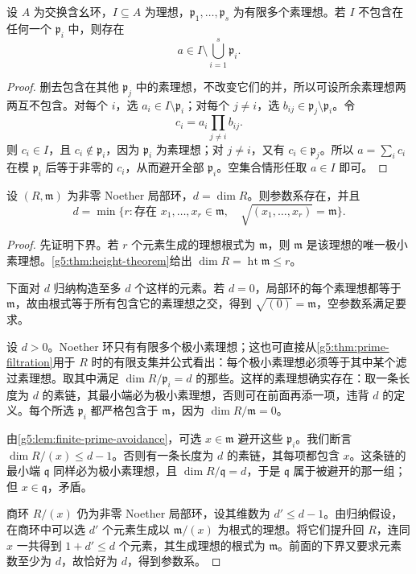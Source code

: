 \begin{lemma}[有限素理想避开引理]
\label{g5:lem:finite-prime-avoidance}
	设 \(A\) 为交换含幺环，\(I\subseteq A\) 为理想，\(\mathfrak p_1,\ldots,\mathfrak p_s\) 为有限多个素理想。若 \(I\) 不包含在任何一个 \(\mathfrak p_i\) 中，则存在
	\[
		a\in I\setminus\bigcup_{i=1}^s\mathfrak p_i.
	\]
\end{lemma}
\begin{proof}
	删去包含在其他 \(\mathfrak p_j\) 中的素理想，不改变它们的并，所以可设所余素理想两两互不包含。对每个 \(i\)，选 \(a_i\in I\setminus\mathfrak p_i\)；对每个 \(j\ne i\)，选 \(b_{ij}\in\mathfrak p_j\setminus\mathfrak p_i\)。令
	\[
		c_i=a_i\prod_{j\ne i}b_{ij}.
	\]
	则 \(c_i\in I\)，且 \(c_i\notin\mathfrak p_i\)，因为 \(\mathfrak p_i\) 为素理想；对 \(j\ne i\)，又有 \(c_i\in\mathfrak p_j\)。所以 \(a=\sum_i c_i\) 在模 \(\mathfrak p_i\) 后等于非零的 \(c_i\)，从而避开全部 \(\mathfrak p_i\)。空集合情形任取 \(a\in I\) 即可。
\end{proof}

\begin{theorem}
\label{g5:thm:system-of-parameters}
	设 \((R,\mathfrak m)\) 为非零 Noether 局部环，\(d=\dim R\)。则参数系存在，并且
	\[
		d=\min\{r:\text{存在 }x_1,\ldots,x_r\in\mathfrak m,\quad
		\sqrt{(x_1,\ldots,x_r)}=\mathfrak m\}.
	\]
\end{theorem}
\begin{proof}
	先证明下界。若 \(r\) 个元素生成的理想根式为 \(\mathfrak m\)，则 \(\mathfrak m\) 是该理想的唯一极小素理想。\cref{g5:thm:height-theorem}给出
	\(\dim R=\operatorname{ht}\mathfrak m\leq r\)。

	下面对 \(d\) 归纳构造至多 \(d\) 个这样的元素。若 \(d=0\)，局部环的每个素理想都等于 \(\mathfrak m\)，故由根式等于所有包含它的素理想之交，得到 \(\sqrt{(0)}=\mathfrak m\)，空参数系满足要求。

	设 \(d>0\)。Noether 环只有有限多个极小素理想；这也可直接从\cref{g5:thm:prime-filtration}用于 \(R\) 时的有限支集并公式看出：每个极小素理想必须等于其中某个滤过素理想。取其中满足
	\(\dim R/\mathfrak p_i=d\)
	的那些。这样的素理想确实存在：取一条长度为 \(d\) 的素链，其最小端必为极小素理想，否则可在前面再添一项，违背 \(d\) 的定义。每个所选 \(\mathfrak p_i\) 都严格包含于 \(\mathfrak m\)，因为 \(\dim R/\mathfrak m=0\)。

	由\cref{g5:lem:finite-prime-avoidance}，可选 \(x\in\mathfrak m\) 避开这些 \(\mathfrak p_i\)。我们断言 \(\dim R/(x)\leq d-1\)。否则有一条长度为 \(d\) 的素链，其每项都包含 \(x\)。这条链的最小端 \(\mathfrak q\) 同样必为极小素理想，且 \(\dim R/\mathfrak q=d\)，于是 \(\mathfrak q\) 属于被避开的那一组；但 \(x\in\mathfrak q\)，矛盾。

	商环 \(R/(x)\) 仍为非零 Noether 局部环，设其维数为 \(d'\leq d-1\)。由归纳假设，在商环中可以选 \(d'\) 个元素生成以 \(\mathfrak m/(x)\) 为根式的理想。将它们提升回 \(R\)，连同 \(x\) 一共得到 \(1+d'\leq d\) 个元素，其生成理想的根式为 \(\mathfrak m\)。前面的下界又要求元素数至少为 \(d\)，故恰好为 \(d\)，得到参数系。
\end{proof}


